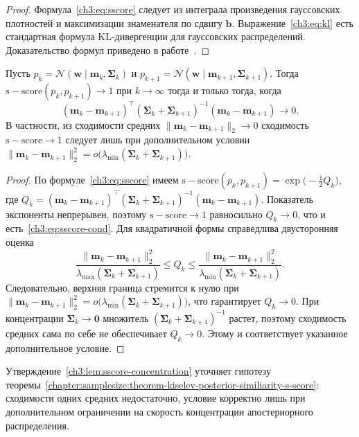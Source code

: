 \begin{proof}
Формула~\eqref{ch3:eq:sscore} следует из интеграла произведения гауссовских плотностей и максимизации знаменателя по сдвигу $\mathbf{b}$. Выражение~\eqref{ch3:eq:kl} есть стандартная формула KL-дивергенции для гауссовских распределений.
Доказательство формул приведено в работе~\cite{grabovoi2025sample727559461}. \end{proof}

\begin{lemma}\label{ch3:lem:sscore-concentration}
Пусть $p_k=\mathcal{N}(\mathbf{w}\mid\mathbf{m}_k,\mathbf{\Sigma}_k)$ и $p_{k+1}=\mathcal{N}(\mathbf{w}\mid\mathbf{m}_{k+1},\mathbf{\Sigma}_{k+1})$. Тогда $\mathrm{s-score}(p_k,p_{k+1})\to 1$ при $k\to\infty$ тогда и только тогда, когда
\begin{equation}\label{ch3:eq:sscore-cond}
  (\mathbf{m}_k-\mathbf{m}_{k+1})^{\top}(\mathbf{\Sigma}_k+\mathbf{\Sigma}_{k+1})^{-1}(\mathbf{m}_k-\mathbf{m}_{k+1})\to 0 .
\end{equation}
В частности, из сходимости средних $\|\mathbf{m}_k-\mathbf{m}_{k+1}\|_2\to 0$ сходимость $\mathrm{s-score}\to 1$ следует лишь при дополнительном условии $\|\mathbf{m}_k-\mathbf{m}_{k+1}\|_2^2=o\bigl(\lambda_{\min}(\mathbf{\Sigma}_k+\mathbf{\Sigma}_{k+1})\bigr)$.
\end{lemma}
\begin{proof}
По формуле~\eqref{ch3:eq:sscore} имеем $\mathrm{s-score}(p_k,p_{k+1})=\exp\bigl(-\tfrac12 Q_k\bigr)$, где $Q_k=(\mathbf{m}_k-\mathbf{m}_{k+1})^{\top}(\mathbf{\Sigma}_k+\mathbf{\Sigma}_{k+1})^{-1}(\mathbf{m}_k-\mathbf{m}_{k+1})$. Показатель экспоненты непрерывен, поэтому $\mathrm{s-score}\to 1$ равносильно $Q_k\to 0$, что и есть~\eqref{ch3:eq:sscore-cond}. Для квадратичной формы справедлива двусторонняя оценка
\[
  \frac{\|\mathbf{m}_k-\mathbf{m}_{k+1}\|_2^2}{\lambda_{\max}(\mathbf{\Sigma}_k+\mathbf{\Sigma}_{k+1})}
  \le Q_k
  \le \frac{\|\mathbf{m}_k-\mathbf{m}_{k+1}\|_2^2}{\lambda_{\min}(\mathbf{\Sigma}_k+\mathbf{\Sigma}_{k+1})}.
\]
Следовательно, верхняя граница стремится к нулю при $\|\mathbf{m}_k-\mathbf{m}_{k+1}\|_2^2=o\bigl(\lambda_{\min}(\mathbf{\Sigma}_k+\mathbf{\Sigma}_{k+1})\bigr)$, что гарантирует $Q_k\to0$. При концентрации $\mathbf{\Sigma}_k\to\mathbf{0}$ множитель $(\mathbf{\Sigma}_k+\mathbf{\Sigma}_{k+1})^{-1}$ растет, поэтому сходимость средних сама по себе не обеспечивает $Q_k\to0$. Этому и соответствует указанное дополнительное условие. \end{proof}
Утверждение~\ref{ch3:lem:sscore-concentration} уточняет гипотезу теоремы~\ref{chapter:samplesize:theorem-kiselev-posterior-similiarity-s-score}: сходимости одних средних недостаточно, условие корректно лишь при дополнительном ограничении на скорость концентрации апостериорного распределения.

